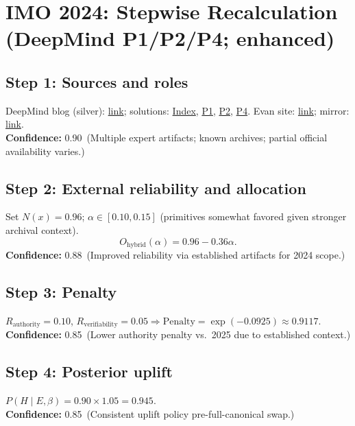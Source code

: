 \documentclass[11pt]{article}
\newcommand{\Nx}{N(x)}
\newcommand{\post}{P(H\mid E,\beta)}
\newcommand{\pen}{\mathrm{Penalty}}
\newcommand{\conf}[2]{\textbf{Confidence:} #1\ (#2)}
\begin{document}
\section{IMO 2024: Stepwise Recalculation (DeepMind P1/P2/P4; enhanced)}
\subsection*{Step 1: Sources and roles}
DeepMind blog (silver): \href{https://deepmind.google/discover/blog/ai-solves-imo-problems-at-silver-medal-level/}{link};
solutions: \href{https://storage.googleapis.com/deepmind-media/DeepMind.com/Blog/imo-2024-solutions/index.html}{Index},
\href{https://storage.googleapis.com/deepmind-media/DeepMind.com/Blog/imo-2024-solutions/P1/index.html}{P1},
\href{https://storage.googleapis.com/deepmind-media/DeepMind.com/Blog/imo-2024-solutions/P2/index.html}{P2},
\href{https://storage.googleapis.com/deepmind-media/DeepMind.com/Blog/imo-2024-solutions/P4/index.html}{P4}.
Evan site: \href{https://web.evanchen.cc/}{link}; mirror: \href{https://olympiads.win.tue.nl/imo}{link}.\\
\conf{0.90}{Multiple expert artifacts; known archives; partial official availability varies.}

\subsection*{Step 2: External reliability and allocation}
Set $\Nx=0.96$; $\alpha\in[0.10,0.15]$ (primitives somewhat favored given stronger archival context).
\[
O_{\text{hybrid}}(\alpha)=0.96-0.36\alpha.
\]
\conf{0.88}{Improved reliability via established artifacts for 2024 scope.}

\subsection*{Step 3: Penalty}
$R_{\text{authority}}=0.10$, $R_{\text{verifiability}}=0.05\Rightarrow \pen=\exp(-0.0925)\approx 0.9117$.\\
\conf{0.85}{Lower authority penalty vs.\ 2025 due to established context.}

\subsection*{Step 4: Posterior uplift}
$\post=0.90\times 1.05=0.945$.\\
\conf{0.85}{Consistent uplift policy pre-full-canonical swap.}
\end{document}
